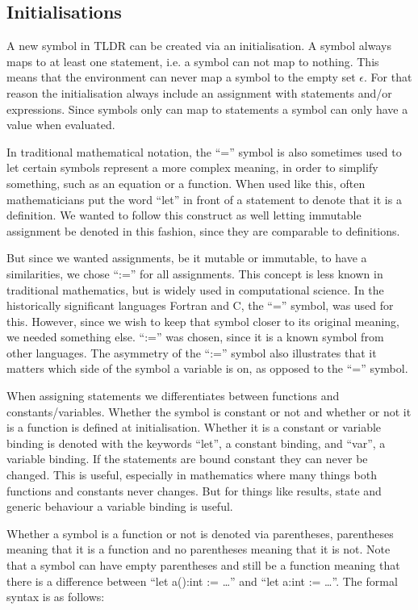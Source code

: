 \subsection{Initialisations}\label{subsec:initialisations}
A new symbol in TLDR can be created via an initialisation. A symbol always maps to at least one statement, i.e. a symbol can not map to nothing. This means that the environment can never map a symbol to the empty set $\epsilon$. For that reason the initialisation always include an assignment with statements and/or expressions. Since symbols only can map to statements a symbol can only have a value when evaluated.

In traditional mathematical notation, the \enquote{=} symbol is also sometimes used to let certain symbols represent a more complex meaning, in order to simplify something, such as an equation or a function. When used like this, often mathematicians put the word \enquote{let} in front of a statement to denote that it is a definition. We wanted to follow this construct as well letting immutable assignment be denoted in this fashion, since they are comparable to definitions. 

But since we wanted assignments, be it mutable or immutable, to have a similarities, we chose \enquote{:=} for all assignments. This concept is less known in traditional mathematics, but is widely used in computational science. In the historically significant languages Fortran and C, the \enquote{=} symbol, was used for this. However, since we wish to keep that symbol closer to its original meaning, we needed something else. \enquote{:=} was chosen, since it is a known symbol from other languages. The asymmetry of the \enquote{:=} symbol also illustrates that it matters which side of the symbol a variable is on, as opposed to the \enquote{=} symbol.

When assigning statements we differentiates between functions and constants/variables. Whether the symbol is constant or not and whether or not it is a function is defined at initialisation. Whether it is a constant or variable binding is denoted with the keywords \enquote{let}, a constant binding, and \enquote{var}, a variable binding. If the statements are bound constant they can never be changed. This is useful, especially in mathematics where many things both functions and constants never changes. But for things like results, state and generic behaviour a variable binding is useful.

Whether a symbol is a function or not is denoted via parentheses, parentheses meaning that it is a function and no parentheses meaning that it is not. Note that a symbol can have empty parentheses and still be a function meaning that there is a difference between \enquote{let a():int := \dots} and \enquote{let a:int := \dots}. The formal syntax is as follows: 

